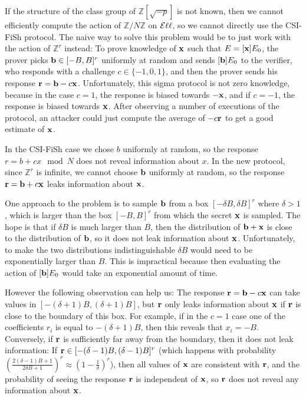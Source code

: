 If the structure of the class group of $\mathbb{Z}[\sqrt{-p}]$ is not known, then we cannot efficiently compute the action of $\mathbb{Z}/N \mathbb{Z}$ on $\mathcal{E}\ell\ell$, so we cannot directly use the CSI-FiSh protocol. The naive way to solve this problem would be to just work with the action of $\mathbb{Z}^r$ instead: To prove knowledge of $\mathbf{x}$ such that $E = [\mathbf{x}]E_0$, the prover picks $\mathbf{b} \in [-B,B]^r$ uniformly at random and sends $[\mathbf{b}]E_0$ to the verifier, who responds with a challenge $c \in \{-1,0,1\}$, and then the prover sends his response $\mathbf{r} = \mathbf{b} - c\mathbf{x}$. Unfortunately, this sigma protocol is not zero knowledge, because in the case $c = 1$, the response is biased towards $-\mathbf{x}$, and if $c = -1$, the response is biased towards $\mathbf{x}$. After observing a number of executions of the protocol, an attacker could just compute the average of $- c \mathbf{r}$ to get a good estimate of $\mathbf{x}$.

In the CSI-FiSh case we chose $b$ uniformly at random, so the response $r = b + cx \mod N$ does not reveal information about $x$. In the new protocol, since $\mathbb{Z}^r$ is infinite, we cannot choose $\mathbf{b}$ uniformly at random, so the response $\mathbf{r} = \mathbf{b} + c \mathbf{x}$ leaks information about $\mathbf{x}$.



One approach to the problem is to sample $\mathbf{b}$ from a box $[-\delta B,\delta B]^r$ where $\delta > 1$, which is larger than the box $[-B,B]^r$ from which the secret $\mathbf{x}$ is sampled. The hope is that if $\delta B$ is much larger than $B$, then the distribution of $\mathbf{b} + \mathbf{x}$ is close to the distribution of $\mathbf{b}$, so it does not leak information about $\mathbf{x}$. Unfortunately, to make the two distributions indistinguishable $\delta B$ would need to be exponentially larger than $B$. This is impractical because then evaluating the action of $[\mathbf{b}]E_0$ would take an exponential amount of time.

However the following observation can help us: The response $\mathbf{r} = \mathbf{b} - c \mathbf{x}$ can take values in $[-(\delta + 1)B,(\delta + 1)B]$, but $\mathbf{r}$ only leaks information about $\mathbf{x}$ if $\mathbf{r}$ is close to the boundary of this box. For example, if in the $c = 1$ case one of the coefficients $r_i$ is equal to $-(\delta+1)B$, then this reveals that $x_i = -B$. Conversely, if $\mathbf{r}$ is sufficiently far away from the boundary, then it does not leak information: If $\mathbf{r} \in [-(\delta-1) B, (\delta-1) B]^r$ (which happens with probability $\left( \frac{2(\delta-1) B+1}{2\delta B+1} \right)^r \approx \left(1 - \frac{1}{\delta}\right)^r$), then all values of $\mathbf{x}$ are consistent with $\mathbf{r}$, and the probability of seeing the response $\mathbf{r}$ is independent of $\mathbf{x}$, so $\mathbf{r}$ does not reveal any information about $\mathbf{x}$. 

